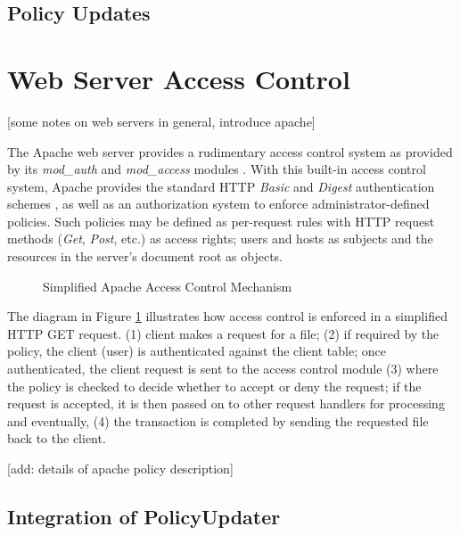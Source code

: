 \documentclass{llncs}
\begin{document}
    \subsection{Policy Updates}

  \section{Web Server Access Control}

    [some notes on web servers in general, introduce apache]

    The Apache web server provides a rudimentary access control system as
    provided by its {\em mod\_auth} and {\em mod\_access} modules
    \cite{AP,LAU}. With this built-in access control system, Apache provides
    the standard HTTP {\em Basic} and {\em Digest} authentication schemes
    \cite{HTTP2}, as well as an authorization system to enforce
    administrator-defined policies. Such policies may be defined as per-request
    rules with HTTP request methods ({\em Get}, {\em Post}, etc.) \cite{HTTP1}
    as access rights; users and hosts as subjects and the resources in the
    server's document root as objects.

    \begin{figure}[ht]
      \begin{center}
        \caption{Simplified Apache Access Control Mechanism}
        \label{fig-1}
      \end{center}
    \end{figure}

    The diagram in Figure \ref{fig-1} illustrates how access control is
    enforced in a simplified HTTP GET request. (1) client makes a request for a
    file; (2) if required by the policy, the client (user) is authenticated
    against the client table; once authenticated, the client request is sent
    to the access control module (3) where the policy is checked to decide
    whether to accept or deny the request; if the request is accepted, it is
    then passed on to other request handlers for processing and eventually,
    (4) the transaction is completed by sending the requested file back to
    the client.

    [add: details of apache policy description]

    \subsection{Integration of PolicyUpdater}
\end{document}
